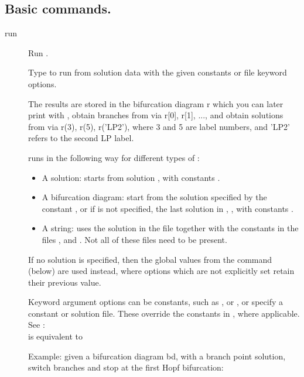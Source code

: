 \documentclass[12pt]{report}
\begin{document}
\subsection{Basic commands.} \label{sec:clui_ref_basic}
\begin{description}
\item[run]
Run \AUTO.

    Type  to run \AUTO from solution data with the given
    \AUTO constants or file keyword options.
    
    The results are stored in the bifurcation diagram r which you can
    later print with , obtain branches from via r[0], r[1], ...,
    and obtain solutions from via r(3), r(5), r('LP2'), where 3 and 5
    are label numbers, and 'LP2' refers to the second LP label.

     runs \AUTO in the following way for different types of :
    \begin{itemize}
    \item
      A solution: \AUTO starts from solution , with \AUTO constants .
    \item
      A bifurcation diagram: \AUTO start from the solution specified by
      the \AUTO constant , or if  is not specified, the last solution
      in , , with \AUTO constants .
    \item
      A string: \AUTO uses the solution in the file  together with the
      constants in the files , and . Not all of these
      files need to be present.
    \end{itemize}

    If no solution  is specified, then the global values from the
     command (below) are used instead, where
    options which are not explicitly set retain their previous value.

    Keyword argument options can be \AUTO constants, such as ,
    or , or specify a constant or solution file. These override
    the constants in , where applicable. See :\\
     is equivalent to 

    Example: given a bifurcation diagram bd, with a branch point
    solution, switch branches and stop at the first Hopf bifurcation:\\
    

\end{description}
\end{document}

